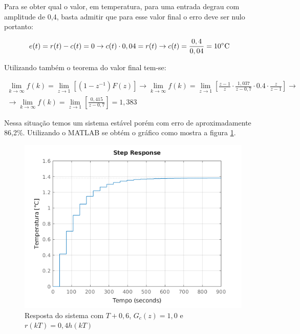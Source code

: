 \documentclass[a4paper,12pt]{article}
\begin{document}
			Para se obter qual o valor, em temperatura, para uma entrada degrau com amplitude de 0,4, basta admitir que para esse valor final o erro deve ser nulo portanto:
			
			\begin{equation}
				\left.
				\begin{array}{c}
					\displaystyle e(t)= r(t) - c(t) = 0 \rightarrow c(t) \cdot 0,04 = r(t) \rightarrow c(t) = \frac{0,4}{0,04} = 10 \celsius
				\end{array}
				\right.
				\quad 
			\end{equation}
			
			Utilizando também o teorema do valor final tem-se:
			
			\begin{equation}
				\left.
				\begin{array}{c}
					\displaystyle \lim_{k \to \infty}f(k) = \lim_{z \to 1}\left[(1-z^{-1})F(z) \right] \rightarrow \lim_{k \to \infty}f(k) = \lim_{z \to 1}\left[ \frac{z-1}{z} \cdot \frac{1,037}{z - 0,7} \cdot 0.4 \cdot \frac{z}{z-1}  \right] \rightarrow \\[20pt]
					
					\displaystyle \rightarrow \lim_{k \to \infty}f(k) =  \lim_{z \to 1}\left[  \frac{0,415}{z - 0,7}  \right] = 1,383
				\end{array}
				\right.
				\quad 
			\end{equation}
			
			Nessa situação temos um sistema estável porém com erro de aproximadamente 86,2\%. Utilizando o MATLAB se obtém o gráfico como mostra a figura \ref{fig:resp_2_4}.
			
			\begin{figure}[H]
				\centering
				\includegraphics[width=0.6\linewidth]{images/resp2d.png}
				\caption{Resposta do sistema com $T+0,6$, $G_c(z)=1,0$ e $r(kT) = 0,4 h(kT)$}
				\label{fig:resp_2_4}
			\end{figure}
			
\end{document}
